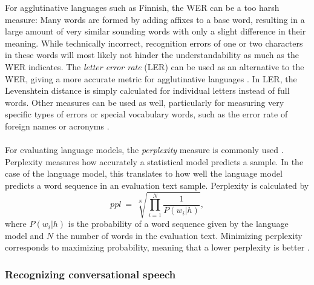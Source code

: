 \documentclass[english, 12pt, a4paper, pdftex, elec, utf8]{aaltothesis}
\begin{document}
For agglutinative languages such as Finnish, the WER can be a too harsh measure: Many words are formed by adding affixes to a base word, resulting in a large amount of very similar sounding words with only a slight difference in their meaning. While technically incorrect, recognition errors of one or two characters in these words will most likely not hinder the understandability as much as the WER indicates. The \textit{letter error rate} (LER) can be used as an alternative to the WER, giving a more accurate metric for agglutinative languages \cite[p.~41--42]{kallasjoki2016}. In LER, the Levenshtein distance is simply calculated for individual letters instead of full words. Other measures can be used as well, particularly for measuring very specific types of errors or special vocabulary words, such as the error rate of foreign names or acronyms \cite{mansikkaniemi2017continuous}.  \\\\
For evaluating language models, the \textit{perplexity} measure is commonly used \cite{mansikkaniemi2017continuous}. Perplexity measures how accurately a statistical model predicts a sample. In the case of the language model, this translates to how well the language model predicts a word sequence in an evaluation text sample. Perplexity is calculated by
\begin{equation}
ppl \ = \ \sqrt[N]{\prod_{i=1}^{N} \frac{1}{P(w_i|h)}},
\end{equation}
where $P(w_i|h)$ is the probability of a word sequence given by the language model and $N$ the number of words in the evaluation text. Minimizing perplexity corresponds to maximizing probability, meaning that a lower perplexity is better \cite{mansikkaniemi2017continuous}.

\subsubsection{Recognizing conversational speech}
\end{document}
